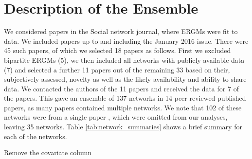 \documentclass[
]{statsoc}
\begin{document}
\section{Description of the Ensemble}\label{sec:description}

We considered papers in the Social network journal, where ERGMs were fit
to data. We included papers up to and including the January 2016 issue.
There were 45 such papers, of which we selected 18 papers as follows.
First we excluded bipartite ERGMs (5), we then included all networks
with publicly available data (7) and selected a further 11 papers out of
the remaining 33 based on their, subjectively assessed, novelty as well
as the likely availability and ability to share data. We contacted the
authors of the 11 papers and received the data for 7 of the papers. This
gave an ensemble of 137 networks in 14 peer reviewed published papers,
as many papers contained multiple networks. We note that 102 of these
networks were from a single paper \citep{Lubbers2007}, which were
omitted from our analyses, leaving 35 networks. Table
\ref{tab:network_summaries} shows a brief summary for each of the
networks.

Remove the covariate column
\end{document}
